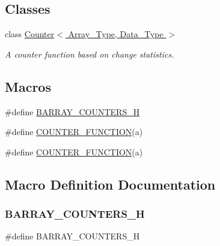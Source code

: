\subsection*{Classes}
\begin{DoxyCompactItemize}
\item 
class \hyperlink{class_counter}{Counter$<$ Array\+\_\+\+Type, Data\+\_\+\+Type $>$}
\begin{DoxyCompactList}\small\item\em A counter function based on change statistics. \end{DoxyCompactList}\end{DoxyCompactItemize}
\subsection*{Macros}
\begin{DoxyCompactItemize}
\item 
\#define \hyperlink{barry_8hpp_a6c60a358a2b89973d5d4b9436374ef8b}{B\+A\+R\+R\+A\+Y\+\_\+\+C\+O\+U\+N\+T\+E\+R\+S\+\_\+H}
\item 
\#define \hyperlink{barry_8hpp_ae7fbc217bad33cff559b1fc41375a8ff}{C\+O\+U\+N\+T\+E\+R\+\_\+\+F\+U\+N\+C\+T\+I\+ON}(a)
\item 
\#define \hyperlink{counters-bones_8hpp_ae7fbc217bad33cff559b1fc41375a8ff}{C\+O\+U\+N\+T\+E\+R\+\_\+\+F\+U\+N\+C\+T\+I\+ON}(a)
\end{DoxyCompactItemize}


\subsection{Macro Definition Documentation}
\mbox{\label{barry_8hpp_a6c60a358a2b89973d5d4b9436374ef8b}} 
\subsubsection{\texorpdfstring{B\+A\+R\+R\+A\+Y\+\_\+\+C\+O\+U\+N\+T\+E\+R\+S\+\_\+H}{BARRAY\_COUNTERS\_H}}
{\footnotesize\ttfamily \#define B\+A\+R\+R\+A\+Y\+\_\+\+C\+O\+U\+N\+T\+E\+R\+S\+\_\+H}



